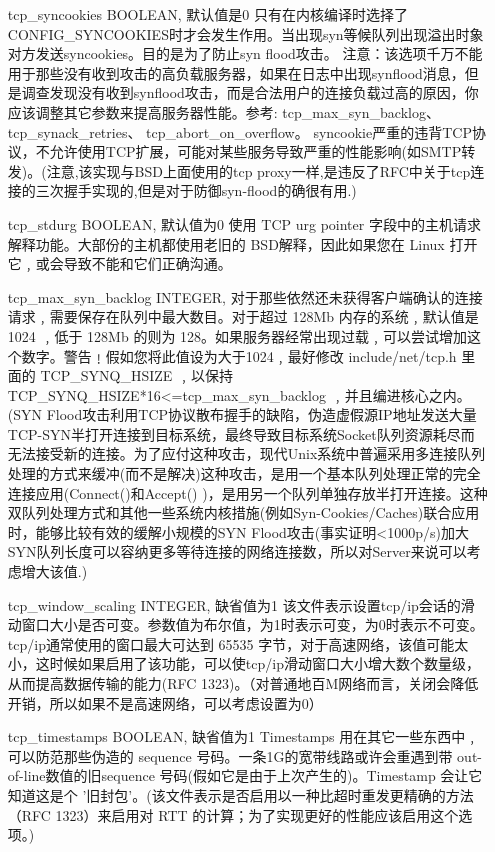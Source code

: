 \begin{enumerate}
\item[tcp\_syncookies] BOOLEAN,
默认值是0
只有在内核编译时选择了CONFIG\_SYNCOOKIES时才会发生作用。当出现syn等候队列出现溢出时象对方发送syncookies。目的是为了防止syn flood攻击。
注意：该选项千万不能用于那些没有收到攻击的高负载服务器，如果在日志中出现synflood消息，但是调查发现没有收到synflood攻击，而是合法用户的连接负载过高的原因，你应该调整其它参数来提高服务器性能。参考:
	tcp\_max\_syn\_backlog、
	tcp\_synack\_retries、
	tcp\_abort\_on\_overflow。
syncookie严重的违背TCP协议，不允许使用TCP扩展，可能对某些服务导致严重的性能影响(如SMTP转发)。(注意,该实现与BSD上面使用的tcp proxy一样,是违反了RFC中关于tcp连接的三次握手实现的,但是对于防御syn-flood的确很有用.)

\item[tcp\_stdurg] BOOLEAN,
默认值为0
使用 TCP urg pointer 字段中的主机请求解释功能。大部份的主机都使用老旧的 BSD解释，因此如果您在 Linux 打开它﹐或会导致不能和它们正确沟通。

\item[tcp\_max\_syn\_backlog] INTEGER,
对于那些依然还未获得客户端确认的连接请求﹐需要保存在队列中最大数目。对于超过 128Mb 内存的系统﹐默认值是1024 ﹐低于 128Mb 的则为 128。如果服务器经常出现过载﹐可以尝试增加这个数字。警告﹗假如您将此值设为大于1024﹐最好修改 include/net/tcp.h 里面的 TCP\_SYNQ\_HSIZE ﹐以保持TCP\_SYNQ\_HSIZE*16<=tcp\_max\_syn\_backlog ﹐并且编进核心之内。(SYN Flood攻击利用TCP协议散布握手的缺陷，伪造虚假源IP地址发送大量TCP-SYN半打开连接到目标系统，最终导致目标系统Socket队列资源耗尽而无法接受新的连接。为了应付这种攻击，现代Unix系统中普遍采用多连接队列处理的方式来缓冲(而不是解决)这种攻击，是用一个基本队列处理正常的完全连接应用(Connect()和Accept() )，是用另一个队列单独存放半打开连接。这种双队列处理方式和其他一些系统内核措施(例如Syn-Cookies/Caches)联合应用时，能够比较有效的缓解小规模的SYN Flood攻击(事实证明<1000p/s)加大SYN队列长度可以容纳更多等待连接的网络连接数，所以对Server来说可以考虑增大该值.)

\item[tcp\_window\_scaling] INTEGER,
缺省值为1
该文件表示设置tcp/ip会话的滑动窗口大小是否可变。参数值为布尔值，为1时表示可变，为0时表示不可变。tcp/ip通常使用的窗口最大可达到 65535 字节，对于高速网络，该值可能太小，这时候如果启用了该功能，可以使tcp/ip滑动窗口大小增大数个数量级，从而提高数据传输的能力(RFC 1323)。（对普通地百M网络而言，关闭会降低开销，所以如果不是高速网络，可以考虑设置为0）

\item[tcp\_timestamps] BOOLEAN,
缺省值为1
Timestamps 用在其它一些东西中﹐可以防范那些伪造的 sequence 号码。一条1G的宽带线路或许会重遇到带 out-of-line数值的旧sequence 号码(假如它是由于上次产生的)。Timestamp 会让它知道这是个 '旧封包'。(该文件表示是否启用以一种比超时重发更精确的方法（RFC 1323）来启用对 RTT 的计算；为了实现更好的性能应该启用这个选项。)


\end{enumerate}
